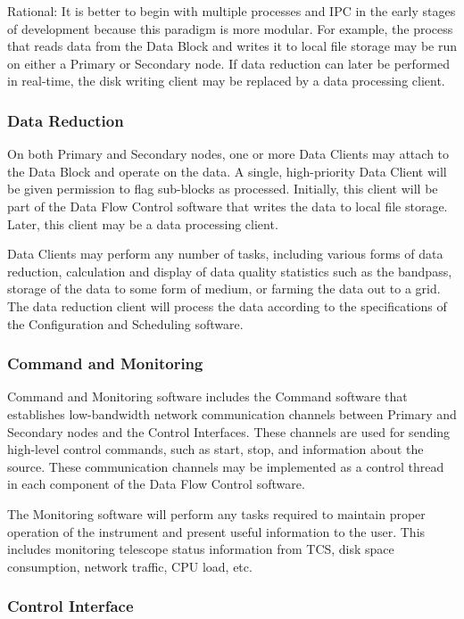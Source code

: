 Rational: It is better to begin with multiple processes and IPC in the
early stages of development because this paradigm is more modular.
For example, the process that reads data from the Data Block and
writes it to local file storage may be run on either a Primary or
Secondary node.  If data reduction can later be performed in
real-time, the disk writing client may be replaced by a data
processing client.

\subsubsection{Data Reduction}

On both Primary and Secondary nodes, one or more Data Clients may
attach to the Data Block and operate on the data.  A single,
high-priority Data Client will be given permission to flag sub-blocks
as processed.  Initially, this client will be part of the Data Flow
Control software that writes the data to local file storage.  Later,
this client may be a data processing client.  

Data Clients may perform any number of tasks, including various forms
of data reduction, calculation and display of data quality statistics
such as the bandpass, storage of the data to some form of medium, or
farming the data out to a grid.  The data reduction client will
process the data according to the specifications of the Configuration
and Scheduling software.

\subsubsection{Command and Monitoring}

Command and Monitoring software includes the Command software that
establishes low-bandwidth network communication channels between
Primary and Secondary nodes and the Control Interfaces.  These
channels are used for sending high-level control commands, such as
start, stop, and information about the source.  These communication
channels may be implemented as a control thread in each component of
the Data Flow Control software. 

The Monitoring software will perform any tasks required to maintain
proper operation of the instrument and present useful information to
the user.  This includes monitoring telescope status information from
TCS, disk space consumption, network traffic, CPU load, etc.

\subsubsection{Control Interface}


